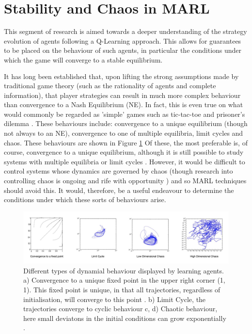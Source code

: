 \documentclass[.../main.tex]{subfiles}
\begin{document}


    \section{Stability and Chaos in MARL} \label{sec::Chaos_in_MARL}

    This segment of research is aimed towards a deeper understanding
    of the strategy evolution of agents following a Q-Learning
    approach. This allows for guarantees to be placed on the behaviour
    of such agents, in particular the conditions under which the game
    will converge to a stable equilibrium.

    It has long been established that, upon lifting the strong
    assumptions made by traditional game theory (such as the
    rationality of agents and complete information), that player
    strategies can result in much more complex behaviour than
    convergence to a Nash Equilibrium (NE). In fact, this is even true
    on what would commonly be regarded as 'simple' games such as
    tic-tac-toe and prisoner's dilemma \cite{Galla2011,
      Sato2002}. These behaviours include: convergence to a unique
    equilibrium (though not always to an NE), convergence to one of
    multiple equilibria, limit cycles and chaos. These behaviours are
    shown in Figure \ref{fig::DynamicalBehaviours} Of these, the most
    preferable is, of course, convergence to a unique equilibrium,
    although it is still possible to study systems with multiple
    equilibria or limit cycles \cite{Strogatz2000}. However, it would
    be difficult to control systems whose dynamics are governed by
    chaos (though research into controlling chaos is ongoing and rife
    with opportunity \cite{Fradkov2009}) and so MARL techniques should
    avoid this. It would, therefore, be a useful endeavour to
    determine the conditions under which these sorts of behaviours
    arise.

    \begin{figure}[h]
    	\centering
    	\includegraphics[width=1.1\textwidth]{Figures/DynamicalBehaviours}
    	\caption{ \label{fig::DynamicalBehaviours} Different types of
          dynamial behaviour displayed by learning agents. a)
          Convergence to a unique fixed point in the upper right
          corner (1, 1). This fixed point is unique, in that all
          trajectories, regardless of initialisation, will converge to
          this point \cite{Tuyls2006AnGames}. b) Limit Cycle, the
          trajectories converge to cyclic behaviour c, d) Chaotic
          behaviour, here small deviatons in the initial conditions
          can grow exponentially \cite{Sanders2018}.}
    \end{figure}
\end{document}
